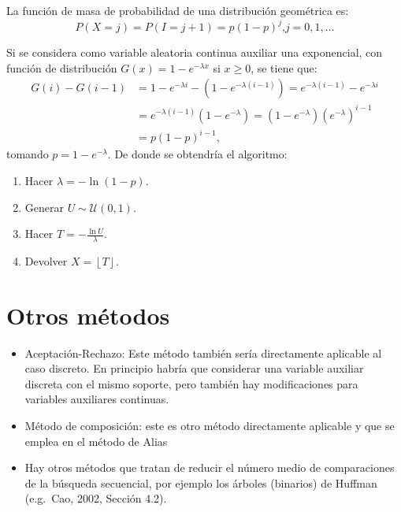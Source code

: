 \documentclass[]{book}
\theoremstyle{definition}
\theoremstyle{definition}
\theoremstyle{definition}
\theoremstyle{remark}
\let\BeginKnitrBlock\begin \let\EndKnitrBlock\end
\begin{document}
\BeginKnitrBlock{example}[distribución geométrica]
\protect\hypertarget{exm:unnamed-chunk-28}{}{\label{exm:unnamed-chunk-28}
{} }
\EndKnitrBlock{example}

La función de masa de probabilidad de una distribución geométrica es:
\[P\left( X=j\right)  =P\left( I=j+1\right)  =p\left( 1-p\right)^{j}\text{,
}j=0,1,\ldots\]

Si se considera como variable aleatoria continua auxiliar una
exponencial, con función de distribución
\(G\left( x\right) = 1-e^{-\lambda x}\) si \(x\geq0\), se tiene que:
\[\begin{aligned}
G\left( i\right) - G\left( i-1\right)   
& = 1-e^{-\lambda i}-\left(1-e^{-\lambda\left( i-1\right) }\right)  
= e^{-\lambda\left( i-1\right)}-e^{-\lambda i}\\
& = e^{-\lambda\left( i-1\right)  }\left( 1-e^{-\lambda}\right)  
= \left( 1-e^{-\lambda}\right)  \left( e^{-\lambda}\right)^{i-1} \\
& = p\left(1-p\right)^{i-1},
\end{aligned}\] tomando \(p=1-e^{-\lambda}\). De donde se obtendría el
algoritmo:

\begin{enumerate}
\def\labelenumi{\arabic{enumi}.}
\setcounter{enumi}{-1}
\item
  Hacer \(\lambda=-\ln\left( 1-p\right)\).
\item
  Generar \(U\sim \mathcal{U}\left( 0,1\right)\).
\item
  Hacer \(T=-\frac{\ln U}{\lambda}\).
\item
  Devolver \(X=\left\lfloor T\right\rfloor\).
\end{enumerate}

\section{Otros métodos}\label{otros-metodos}

\begin{itemize}
\item
  Aceptación-Rechazo: Este método también sería directamente aplicable
  al caso discreto. En principio habría que considerar una variable
  auxiliar discreta con el mismo soporte, pero también hay
  modificaciones para variables auxiliares continuas.
\item
  Método de composición: este es otro método directamente aplicable y
  que se emplea en el método de Alias
\item
  Hay otros métodos que tratan de reducir el número medio de
  comparaciones de la búsqueda secuencial, por ejemplo los árboles
  (binarios) de Huffman (e.g.~Cao, 2002, Sección 4.2).
\end{itemize}
\end{document}
